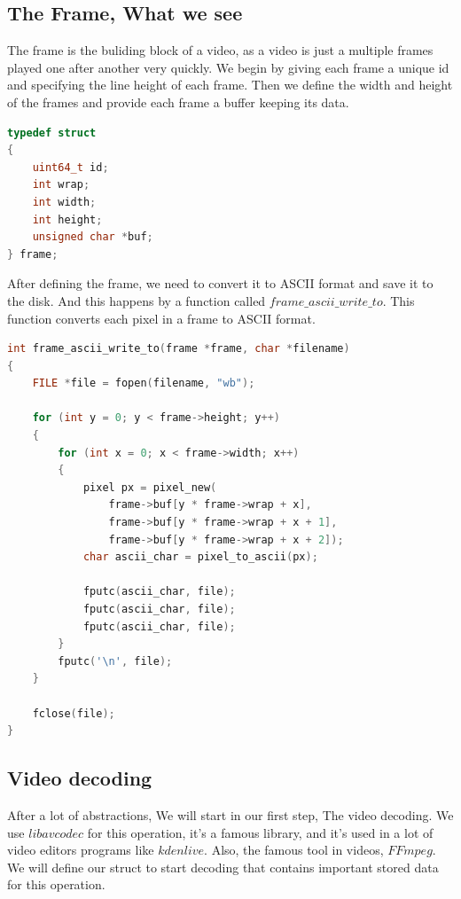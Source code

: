 \documentclass[a4paper,12pt]{article}
\begin{document}
\subsection{The Frame, What we see}

The frame is the buliding block of a video, as a video is just a multiple frames played one after another very quickly.
We begin by giving each frame a unique id and specifying the line height of each frame. Then we define the width and height of the frames and provide each frame a buffer keeping its data.


\begin{lstlisting}[language=c]
typedef struct
{
    uint64_t id;
    int wrap;
    int width;
    int height;
    unsigned char *buf;
} frame;
\end{lstlisting}
\newpage

After defining the frame, we need to convert it to ASCII format and save it to the disk. And this happens by a function called $frame\_ascii\_write\_to$. This function converts each pixel in a frame to ASCII format.

\begin{lstlisting}[language=c]
int frame_ascii_write_to(frame *frame, char *filename)
{
    FILE *file = fopen(filename, "wb");

    for (int y = 0; y < frame->height; y++)
    {
        for (int x = 0; x < frame->width; x++)
        {
            pixel px = pixel_new(
                frame->buf[y * frame->wrap + x],
                frame->buf[y * frame->wrap + x + 1],
                frame->buf[y * frame->wrap + x + 2]);
            char ascii_char = pixel_to_ascii(px);

            fputc(ascii_char, file);
            fputc(ascii_char, file);
            fputc(ascii_char, file);
        }
        fputc('\n', file);
    }

    fclose(file);
}
\end{lstlisting}

\subsection{Video decoding}
After a lot of abstractions, We will start in our first step, The video decoding. We use $libavcodec$ for this operation, it's a famous library, and it's used in a lot of video editors programs like $kdenlive$. Also, the famous tool in videos, $FFmpeg$.\\ 

We will define our struct to start decoding that contains important stored data for this operation.
\end{document}
